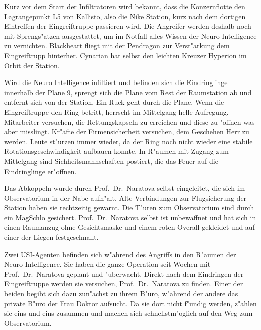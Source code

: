 Kurz vor dem Start der Infiltratoren wird bekannt, dass die Konzernflotte den Lagrangepunkt L5 von Kallisto, also die Nike Station, kurz nach dem dortigen Eintreffen der Eingreiftruppe passieren wird. Die Angreifer werden deshalb noch mit Sprengs"atzen ausgestattet, um im Notfall alles Wissen der Neuro Intelligence zu vernichten. Blackheart fliegt mit der Pendragon zur Verst"arkung dem Eingreiftrupp hinterher. Cynarian hat selbst den leichten Kreuzer Hyperion im Orbit der Station.

Wird die Neuro Intelligence infiltiert und befinden sich die Eindringlinge innerhalb der Plane 9, sprengt sich die Plane vom Rest der Raumstation ab und entfernt sich von der Station. Ein Ruck geht durch die Plane. Wenn die Eingreiftruppe den Ring betritt, herrscht im Mittelgang helle Aufregung. Mitarbeiter versuchen, die Rettungskapseln zu erreichen und diese zu "offnen was aber misslingt. Kr"afte der Firmensicherheit versuchen, dem Geschehen Herr zu werden. Leute st"urzen immer wieder, da der Ring noch nicht wieder eine stabile Rotationsgeschwindigkeit aufbauen konnte. In R"aumen mit Zugang zum Mittelgang sind Sichheitsmannschaften postiert, die das Feuer auf die Eindringlinge er"offnen.

Das Abkoppeln wurde durch Prof.~Dr.~Naratova selbst eingeleitet, die sich im Observatorium in der Nabe aufh"alt. Alte Verbindungen zur Flugsicherung der Station haben sie rechtzeitig gewarnt. Die T"uren zum Observatorium sind durch ein MagSchlo\3 gesichert. Prof.~Dr.~Naratova selbst ist unbewaffnet und hat sich in einen Raumanzug ohne Gesichtsmaske und einem roten Overall gekleidet und auf einer der Liegen festgeschnallt.

Zwei USI-Agenten befinden sich w"ahrend des Angriffs in den R"aumen der Neuro Intelligence. Sie haben die ganze Operation seit Wochen mit Prof.~Dr.~Naratova geplant und "uberwacht. Direkt nach dem Eindringen der Eingreiftruppe werden sie versuchen, Prof.~Dr.~Naratova zu finden. Einer der beiden begibt sich dazu zun"achst zu ihrem B"uro, w"ahrend der andere das private B"uro der Frau Doktor aufsucht. Da sie dort nicht f"undig werden, z"ahlen sie eins und eins zusammen und machen  sich schnellstm"oglich auf den Weg zum Observatorium.

